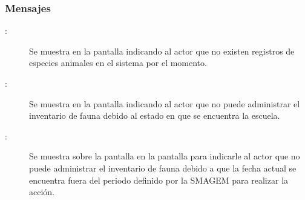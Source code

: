 \subsubsection{Mensajes}

    \begin{description}
    \item [:] Se muestra en la pantalla  indicando al actor que no existen registros de especies animales en el sistema por el momento.
    
    \item[:] Se muestra en la pantalla  indicando al actor que no puede administrar el inventario de fauna debido al estado en que se encuentra la escuela.
    
    \item [:] Se muestra sobre la pantalla en la pantalla  para indicarle al actor que no puede administrar el inventario de fauna debido a que la fecha actual se encuentra fuera del periodo definido por la SMAGEM para realizar la acción.
    \end{description}